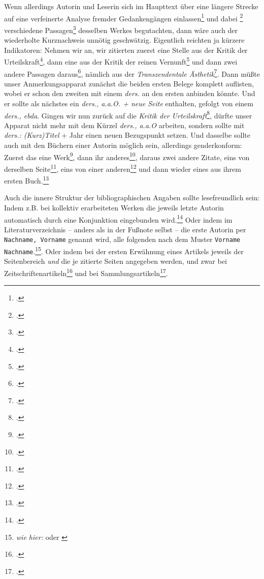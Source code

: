 Wenn allerdings Autorin und Leserin sich im Haupttext über eine längere Strecke auf eine verfeinerte Analyse fremder Gedankengängen einlassen\footcite[\emph{wie hier}: vgl. etwa][32]{Allen2001a} und dabei \footcite[\emph{wie hier}: vgl.][139]{Allen2001a} verschiedene Passagen\footcite[\emph{wie hier}: vgl.][139]{Allen2001a} desselben Werkes begutachten, dann wäre auch der wiederholte Kurznachweis unnötig geschwätzig. Eigentlich reichten ja kürzere Indikatoren: Nehmen wir an, wir zitierten zuerst eine Stelle aus der Kritik der Urteilskraft\footcite[vgl.][9]{KantKdU1974}, dann eine aus der Kritik der reinen Vernunft\footcite[vgl.][45]{KantKdV1974} und dann zwei andere Passagen daraus\footcite[vgl.][69]{KantKdV1974}, nämlich aus der \emph{Transzendentale Ästhetik}\footcite[vgl.][69]{KantKdV1974}. Dann müßte unser Anmerkungsapparat zunächst die beiden ersten Belege komplett auflisten, wobei er schon den zweiten mit einem \emph{ders.} an den ersten anbinden könnte. Und er sollte als nächstes ein \emph{ders., a.a.O. + neue Seite} enthalten, gefolgt von einem
\emph{ders., ebda}. Gingen wir nun zurück auf die \emph{Kritik der Urteilskraft}\footcite[vgl.][9]{KantKdU1974}, dürfte unser Apparat nicht mehr mit dem Kürzel \emph{ders., a.a.O} arbeiten, sondern sollte mit \emph{ders.: (Kurz)Titel} + Jahr einen neuen Bezugspunkt setzen. Und dasselbe sollte auch mit den Büchern einer Autorin möglich sein, allerdings genderkonform: Zuerst das eine Werk\footcite[\emph{wie hier:} vgl.][99]{Hamburger1985a}, dann ihr anderes\footcite[\emph{wie hier:} vgl.][33]{Hamburger1980a}, daraus zwei andere Zitate, eins von derselben Seite\footcite[\emph{wie hier:} vgl.][33]{Hamburger1980a}, eins von einer anderen\footcite[\emph{wie hier:} vgl.][105]{Hamburger1980a} und dann wieder eines aus ihrem ersten Buch.\footcite[\emph{wie hier:} vgl.][99]{Hamburger1985a}

Auch die innere Struktur der bibliographischen Angaben sollte lesefreundlich sein: Indem z.B. bei kollektiv erarbeiteten Werken die jeweils letzte Autorin automatisch durch eine Konjunktion eingebunden wird.\footcite[\emph{wie hier}: vgl.][]{SegEvaTay2009a} Oder indem im Literaturverzeichnis -- anders als in der Fußnote selbst -- die erste Autorin per \texttt{Nachname, Vorname} genannt wird, alle folgenden nach dem Muster \texttt{Vorname Nachname}.\footnote{\emph{wie hier:} \cite[bei][]{GarSpr2018a} oder \cite[bei:][]{RusNor2004a}}. Oder indem bei der ersten Erwähnung eines Artikels jeweils der Seitenbereich \emph{und} die je zitierte Seiten angegeben werden, und zwar bei Zeitschriftenartikeln\footcite[\emph{wie hier:} vgl.][51]{Siart2008a} und bei Sammlungsartikeln\footcite[\emph{wie hier:} vgl.][269]{Frobenius1998a}.

